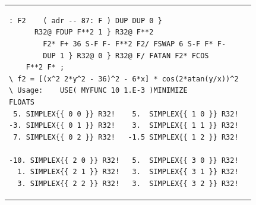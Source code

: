 \begin{figure}[H]
\begin{tabular}{l|l}
\begin{lstlisting}
: F2    ( adr -- 87: F ) DUP DUP 0 }
      R32@ FDUP F**2 1 } R32@ F**2
        F2* F+ 36 S-F F- F**2 F2/ FSWAP 6 S-F F* F-
        DUP 1 } R32@ 0 } R32@ F/ FATAN F2* FCOS
    F**2 F* ;
\ f2 = [(x^2 2*y^2 - 36)^2 - 6*x] * cos(2*atan(y/x))^2
\ Usage:    USE( MYFUNC 10 1.E-3 )MINIMIZE
FLOATS
 5. SIMPLEX{{ 0 0 }} R32!    5.  SIMPLEX{{ 1 0 }} R32!
-3. SIMPLEX{{ 0 1 }} R32!    3.  SIMPLEX{{ 1 1 }} R32!
 7. SIMPLEX{{ 0 2 }} R32!   -1.5 SIMPLEX{{ 1 2 }} R32!

-10. SIMPLEX{{ 2 0 }} R32!   5.  SIMPLEX{{ 3 0 }} R32!
  1. SIMPLEX{{ 2 1 }} R32!   3.  SIMPLEX{{ 3 1 }} R32!
  3. SIMPLEX{{ 2 2 }} R32!   3.  SIMPLEX{{ 3 2 }} R32!
        \end{lstlisting}
    \end{tabular}
\end{figure}
